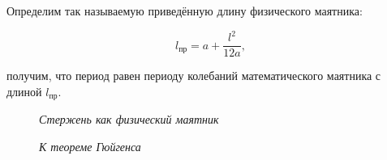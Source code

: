 \documentclass[a4paper,12pt]{article}
\begin{document}
\noindent

Определим так называемую приведённую длину физического маятника:

\begin{equation}
    l_{\text{пр}} = a + \frac{l^2}{12 a},
\end{equation}

получим, что период равен периоду колебаний математического маятника с длиной $l_{\text{пр}}$.


\begin{figure}[h!]
    \begin{minipage}{0.49\linewidth}
        \caption{\textit{Стержень как физический маятник}}
    \end{minipage}
    \hfill
    \begin{minipage}{0.49\linewidth}
        \caption{\textit{К теореме Гюйгенса}}
    \end{minipage}
\end{figure}
\end{document}
